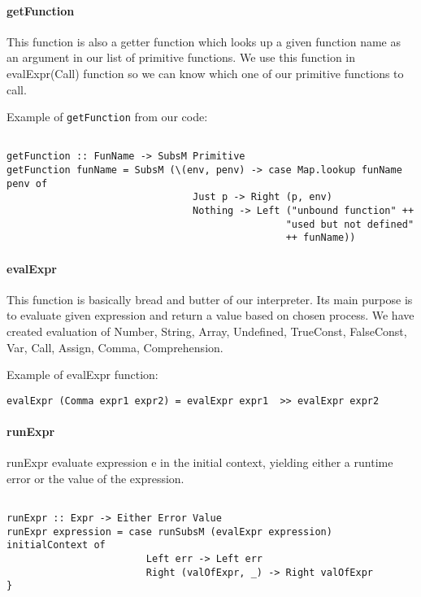 \documentclass[11pt]{article}
\begin{document}
\paragraph{getFunction}
This function is also a getter function which looks up a given function name as an argument in our list of primitive functions.
We use this function in evalExpr(Call) function so we can know which one of our primitive functions to call.



Example of \texttt{getFunction} from our code:
\begin{verbatim}

getFunction :: FunName -> SubsM Primitive
getFunction funName = SubsM (\(env, penv) -> case Map.lookup funName penv of
                                Just p -> Right (p, env)
                                Nothing -> Left ("unbound function" ++
                                                "used but not defined"
                                                ++ funName))
\end{verbatim}


\paragraph{evalExpr}
This function is basically bread and butter of our interpreter. Its main purpose is to evaluate given expression and return a value based on chosen process. We have created evaluation of Number, String, Array, Undefined, TrueConst, FalseConst, Var, Call, Assign, Comma, Comprehension. 

Example of evalExpr function:

\begin{verbatim}
evalExpr (Comma expr1 expr2) = evalExpr expr1  >> evalExpr expr2

\end{verbatim}



\paragraph{runExpr}
runExpr evaluate expression e in the initial context, yielding either a runtime error or the value of the expression.
\begin{verbatim}

runExpr :: Expr -> Either Error Value
runExpr expression = case runSubsM (evalExpr expression) initialContext of
  						Left err -> Left err
  						Right (valOfExpr, _) -> Right valOfExpr
}
\end{verbatim}
\end{document}
